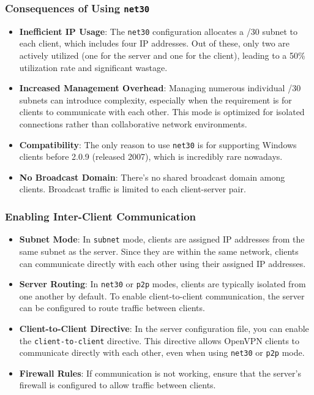\subsubsection{Consequences of Using \texttt{net30}}
\begin{itemize}
\item \textbf{Inefficient IP Usage}: The \texttt{net30} configuration allocates a /30 subnet to each client, which includes four IP addresses. Out of these, only two are actively utilized (one for the server and one for the client), leading to a 50\% utilization rate and significant wastage.
\item \textbf{Increased Management Overhead}: Managing numerous individual /30 subnets can introduce complexity, especially when the requirement is for clients to communicate with each other. This mode is optimized for isolated connections rather than collaborative network environments.
\item \textbf{Compatibility}: The only reason to use \texttt{net30} is for supporting Windows clients before 2.0.9 (released 2007), which is incredibly rare nowadays. 
\item \textbf{No Broadcast Domain}: There's no shared broadcast domain among clients. Broadcast traffic is limited to each client-server pair.
\end{itemize}

\subsubsection{Enabling Inter-Client Communication}
\begin{itemize}
    \item \textbf{Subnet Mode}: In \texttt{subnet} mode, clients are assigned IP addresses from the same subnet as the server. Since they are within the same network, clients can communicate directly with each other using their assigned IP addresses. 
    \item \textbf{Server Routing}: In \texttt{net30} or \texttt{p2p} modes, clients are typically isolated from one another by default. To enable client-to-client communication, the server can be configured to route traffic between clients.
    \item \textbf{Client-to-Client Directive}: In the server configuration file, you can enable the \texttt{client-to-client} directive. This directive allows OpenVPN clients to communicate directly with each other, even when using \texttt{net30} or \texttt{p2p} mode. 
    \item \textbf{Firewall Rules}: If communication is not working, ensure that the server's firewall is configured to allow traffic between clients.
\end{itemize}


